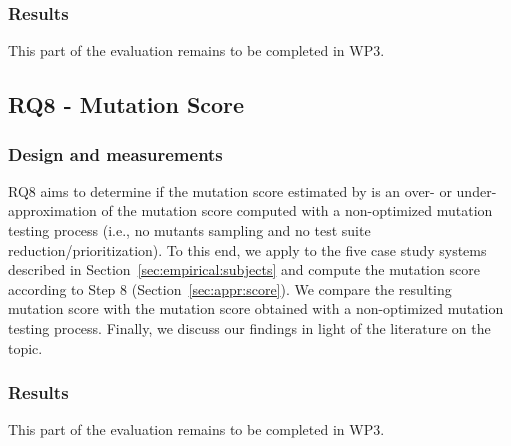 \subsubsection*{Results}

This part of the evaluation remains to be completed in WP3.
%
%


\subsection{RQ8 - \APPR Mutation Score}

\subsubsection*{Design and measurements}


RQ8 aims to determine if the mutation score estimated by \APPR is an over- or under- approximation of the mutation score computed with a  non-optimized mutation testing process (i.e., no mutants sampling and no test suite reduction/prioritization). 
To this end, we apply \APPR to the five case study systems described in Section~\ref{sec:empirical:subjects} and compute the mutation score according to \APPR Step 8 (Section~\ref{sec:appr:score}).
 We compare the resulting mutation score with the mutation score obtained with a non-optimized mutation testing process.
Finally, we discuss our findings in light of the literature on the topic.



\subsubsection*{Results}

This part of the evaluation remains to be completed in WP3.

%
%
%


